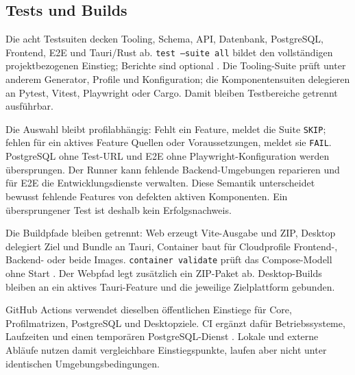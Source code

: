 \subsection{Tests und Builds}
\label{subsec:tests-builds}

Die acht Testsuiten decken Tooling, Schema, API, Datenbank, PostgreSQL,
Frontend, E2E und Tauri/Rust ab. \texttt{test --suite all} bildet den
vollständigen projektbezogenen Einstieg; Berichte sind optional
\parencite{kleiveist2026control,kleiveist2026tooling}.
Die Tooling-Suite prüft unter anderem Generator, Profile und Konfiguration; die
Komponentensuiten delegieren an Pytest, Vitest, Playwright oder Cargo. Damit
bleiben Testbereiche getrennt ausführbar.

Die Auswahl bleibt profilabhängig: Fehlt ein Feature, meldet die Suite
\texttt{SKIP}; fehlen für ein aktives Feature Quellen oder Voraussetzungen,
meldet sie \texttt{FAIL}. PostgreSQL ohne Test-URL und E2E ohne
Playwright-Konfiguration werden übersprungen. Der Runner kann fehlende
Backend-Umgebungen reparieren und für E2E die Entwicklungsdienste verwalten.
Diese Semantik unterscheidet bewusst fehlende Features von defekten aktiven
Komponenten. Ein übersprungener Test ist deshalb kein Erfolgsnachweis.

Die Buildpfade bleiben getrennt: Web erzeugt Vite-Ausgabe und ZIP, Desktop
delegiert Ziel und Bundle an Tauri, Container baut für Cloudprofile Frontend-,
Backend- oder beide Images. \texttt{container validate} prüft das
Compose-Modell ohne Start \parencite{kleiveist2026container,kleiveist2026release}.
Der Webpfad legt zusätzlich ein ZIP-Paket ab. Desktop-Builds bleiben an ein
aktives Tauri-Feature und die jeweilige Zielplattform gebunden.

GitHub Actions verwendet dieselben öffentlichen Einstiege für Core,
Profilmatrizen, PostgreSQL und Desktopziele. CI ergänzt dafür Betriebssysteme,
Laufzeiten und einen temporären PostgreSQL-Dienst
\parencite{kleiveist2026ci}.
Lokale und externe Abläufe nutzen damit vergleichbare Einstiegspunkte, laufen
aber nicht unter identischen Umgebungsbedingungen.
